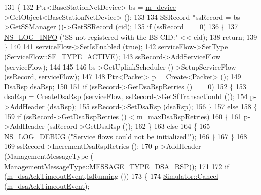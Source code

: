 \begin{DoxyCode}
131 \{
132   Ptr<BaseStationNetDevice> bs = \hyperlink{classns3_1_1BsServiceFlowManager_a6fa275f84e4458c687787b1974a00382}{m\_device}->GetObject<BaseStationNetDevice> ();
133 
134   SSRecord *ssRecord = bs->GetSSManager ()->GetSSRecord (cid);
135   \textcolor{keywordflow}{if} (ssRecord == 0)
136     \{
137       \hyperlink{group__logging_gafbd73ee2cf9f26b319f49086d8e860fb}{NS\_LOG\_INFO} (\textcolor{stringliteral}{"SS not registered with the BS CID:"} << cid);
138       \textcolor{keywordflow}{return};
139     \}
140 
141   serviceFlow->SetIsEnabled (\textcolor{keyword}{true});
142   serviceFlow->SetType (\hyperlink{classns3_1_1ServiceFlow_a95a18bd8cae3a4eaa3568dad45ae941da68cc7128fe19a5d911aace393cc12bd5}{ServiceFlow::SF\_TYPE\_ACTIVE});
143   ssRecord->AddServiceFlow (serviceFlow);
144 
145 
146   bs->GetUplinkScheduler ()->SetupServiceFlow (ssRecord, serviceFlow);
147 
148   Ptr<Packet> \hyperlink{lte__link__budget_8m_ac9de518908a968428863f829398a4e62}{p} = Create<Packet> ();
149   DsaRsp dsaRsp;
150 
151   \textcolor{keywordflow}{if} (ssRecord->GetDsaRspRetries () == 0)
152     \{
153       dsaRsp = \hyperlink{classns3_1_1BsServiceFlowManager_ac67cef767e9e9c07403b9b0ed795619b}{CreateDsaRsp} (serviceFlow, ssRecord->GetSfTransactionId ());
154       p->AddHeader (dsaRsp);
155       ssRecord->SetDsaRsp (dsaRsp);
156     \}
157   \textcolor{keywordflow}{else}
158     \{
159       \textcolor{keywordflow}{if} (ssRecord->GetDsaRspRetries () < \hyperlink{classns3_1_1BsServiceFlowManager_a187563222d3a6b050019ba4e71f916d8}{m\_maxDsaRspRetries})
160         \{
161           p->AddHeader (ssRecord->GetDsaRsp ());
162         \}
163       \textcolor{keywordflow}{else}
164         \{
165           \hyperlink{group__logging_ga413f1886406d49f59a6a0a89b77b4d0a}{NS\_LOG\_DEBUG} (\textcolor{stringliteral}{"Service flows could not be initialized!"});
166         \}
167     \}
168 
169   ssRecord->IncrementDsaRspRetries ();
170   p->AddHeader (ManagementMessageType (
      \hyperlink{classns3_1_1ManagementMessageType_a0e0c7a1e263538f0379d1bdb015abe3dafcc36bf51cd0bf98daaa56183458c2af}{ManagementMessageType::MESSAGE\_TYPE\_DSA\_RSP}));
171 
172   \textcolor{keywordflow}{if} (\hyperlink{classns3_1_1BsServiceFlowManager_adc5e10a0a7b826157a09da28fb4f3c0f}{m\_dsaAckTimeoutEvent}.\hyperlink{classns3_1_1EventId_aabf8476d1a080c199ea0c6aa9ccea372}{IsRunning} ())
173     \{
174       \hyperlink{classns3_1_1Simulator_a1b903a62d6117ef28f7ba3c6500689bf}{Simulator::Cancel} (\hyperlink{classns3_1_1BsServiceFlowManager_adc5e10a0a7b826157a09da28fb4f3c0f}{m\_dsaAckTimeoutEvent});

\end{DoxyCode}

